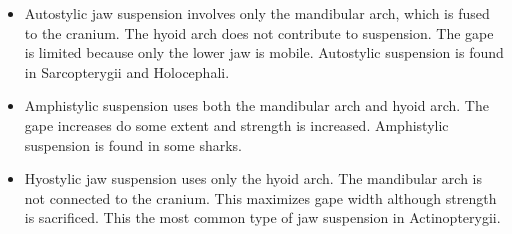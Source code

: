 \documentclass[11pt, addpoints]{exam}
\begin{document}
\begin{questions}
\begin{solution}
	\begin{itemize}
		\item Autostylic jaw suspension involves only the mandibular arch, which is fused to the cranium. The hyoid arch does not contribute to suspension. The gape is limited because only the lower jaw is mobile. Autostylic suspension is found in Sarcopterygii and Holocephali.
		\item Amphistylic suspension uses both the mandibular arch and hyoid arch. The gape increases do some extent and strength is increased. Amphistylic suspension is found in some sharks.
		\item Hyostylic jaw suspension uses only the hyoid arch. The mandibular arch is not connected to the cranium. This maximizes gape width although strength is sacrificed. This the most common type of jaw suspension in Actinopterygii.
	\end{itemize}
\end{solution}

%
%
%
%
\end{questions}


\newpage


\end{document}

